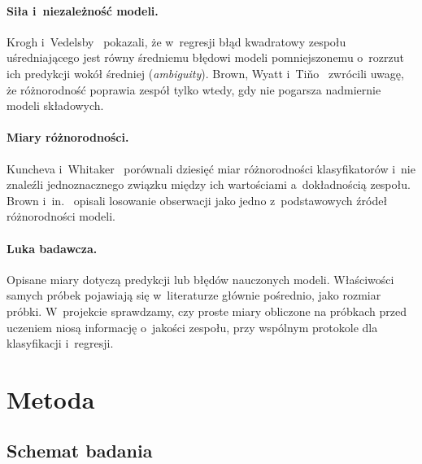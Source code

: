 \documentclass[11pt,a4paper]{article}
\begin{document}
\paragraph{Siła i~niezależność modeli.} Krogh i~Vedelsby~\cite{krogh1995} pokazali, że w~regresji błąd kwadratowy zespołu uśredniającego jest równy średniemu błędowi modeli pomniejszonemu o~rozrzut ich predykcji wokół średniej (\emph{ambiguity}). Brown, Wyatt i~Tiňo~\cite{brown2005} zwrócili uwagę, że różnorodność poprawia zespół tylko wtedy, gdy nie pogarsza nadmiernie modeli składowych.

\paragraph{Miary różnorodności.} Kuncheva i~Whitaker~\cite{kuncheva2003} porównali dziesięć miar różnorodności klasyfikatorów i~nie znaleźli jednoznacznego związku między ich wartościami a~dokładnością zespołu. Brown i~in.~\cite{brown2005survey} opisali losowanie obserwacji jako jedno z~podstawowych źródeł różnorodności modeli.

\paragraph{Luka badawcza.} Opisane miary dotyczą predykcji lub błędów nauczonych modeli. Właściwości samych próbek pojawiają się w~literaturze głównie pośrednio, jako rozmiar próbki. W~projekcie sprawdzamy, czy proste miary obliczone na próbkach przed uczeniem niosą informację o~jakości zespołu, przy wspólnym protokole dla klasyfikacji i~regresji.

\section{Metoda}

\subsection{Schemat badania}
\label{sec:schemat}
\end{document}
